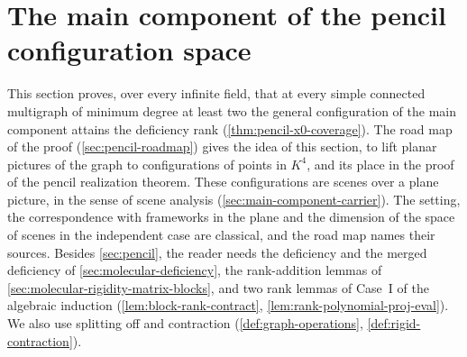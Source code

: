 \section{The main component of the pencil configuration space}
\label{sec:main-component}

This section proves, over every infinite field, that at every simple
connected multigraph of minimum degree at least two the general
configuration of the main component attains the deficiency rank
(\cref{thm:pencil-x0-coverage}). The road map of the proof
(\cref{sec:pencil-roadmap}) gives the idea of this section, to lift
planar pictures of the graph to configurations of points in $K^4$, and
its place in the proof of the pencil realization theorem. These
configurations are scenes over a plane picture, in the sense of scene
analysis (\cref{sec:main-component-carrier}). The setting, the
correspondence with frameworks in the plane and the dimension of the
space of scenes in the independent case are classical, and the road map
names their sources. Besides
\cref{sec:pencil}, the reader needs the deficiency and the merged deficiency of
\cref{sec:molecular-deficiency}, the rank-addition lemmas of \cref{sec:molecular-rigidity-matrix-blocks},
and two rank lemmas of Case~I of the algebraic induction
(\cref{lem:block-rank-contract}, \cref{lem:rank-polynomial-proj-eval}).
We also use splitting off and
contraction (\cref{def:graph-operations}, \cref{def:rigid-contraction}).

